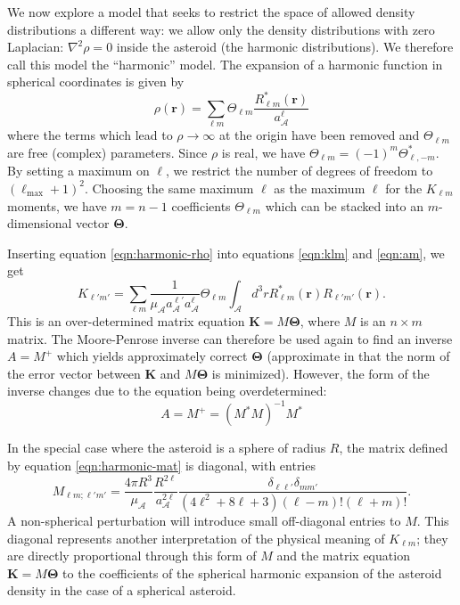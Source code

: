 \documentclass[fleqn,usenatbib]{mnras}
\begin{document}
We now explore a model that seeks to restrict the space of allowed density distributions a different way: we allow only the density distributions with zero Laplacian: $\nabla^2 \rho = 0$ inside the asteroid (the harmonic distributions). We therefore call this model the ``harmonic'' model. The expansion of a harmonic function in spherical coordinates is given by 
\begin{equation}
  \rho(\bm r) = \sum_{\ell m} \Theta_{\ell m}\frac{R_{\ell m}^*(\bm r)}{a_\mathcal{A}^\ell} 
  \label{eqn:harmonic-rho}
\end{equation}
where the terms which lead to $\rho \rightarrow \infty$ at the origin have been removed and $\Theta_{\ell m}$ are free (complex) parameters. Since $\rho$ is real, we have $\Theta_{\ell m}=(-1)^m \Theta_{\ell,-m}^*$. By setting a maximum on $\ell$, we restrict the number of degrees of freedom to $(\ell_\mathrm{max}+ 1)^2$. Choosing the same maximum $\ell$ as the maximum $\ell$ for the $K_{\ell m}$ moments, we have $m=n-1$ coefficients $\Theta_{\ell m}$ which can be stacked into an $m$-dimensional vector $\bm \Theta$.

Inserting equation \ref{eqn:harmonic-rho} into equations \ref{eqn:klm} and \ref{eqn:am}, we get 
\begin{equation}
  K_{\ell' m'} = \sum_{\ell m} \frac{1}{\mu_\mathcal{A} a_\mathcal{A}^{\ell'} a_\mathcal{A}^\ell} \Theta_{\ell m} \int_\mathcal{A} d^3 r R_{\ell m}^*(\bm r) R_{\ell' m'}(\bm r).
  \label{eqn:harmonic-mat}
\end{equation}
This is an over-determined matrix equation $\bm K = M \bm \Theta$, where $M$ is an $n \times m$ matrix. The Moore-Penrose inverse can therefore be used again to find an inverse $A=M^+$ which yields approximately correct $\bm \Theta$ (approximate in that the norm of the error vector between $\bm K$ and $M \bm \Theta$ is minimized). However, the form of the inverse changes due to the equation being overdetermined:
\begin{equation}
  A=M^+ = (M^*M)^{-1} M^*
  \label{eqn:mpi-overdetermined}
\end{equation}

In the special case where the asteroid is a sphere of radius $R$, the matrix defined by equation \ref{eqn:harmonic-mat} is diagonal, with entries 
\begin{equation}
  M_{\ell m; \ell' m'} = \frac{4\pi R^3}{\mu_\mathcal{A}} \frac{R^{2\ell}}{a_\mathcal{A}^{2\ell}} \frac{\delta_{\ell \ell'} \delta_{m m'}}{(4\ell^2 + 8\ell + 3)(\ell - m)!(\ell+m)!}.
\end{equation}
A non-spherical perturbation will introduce small off-diagonal entries to $M$. This diagonal represents another interpretation of the physical meaning of $K_{\ell m}$; they are directly proportional through this form of $M$ and the matrix equation $\bm K = M \bm \Theta$ to the coefficients of the spherical harmonic expansion of the asteroid density in the case of a spherical asteroid.
\end{document}

